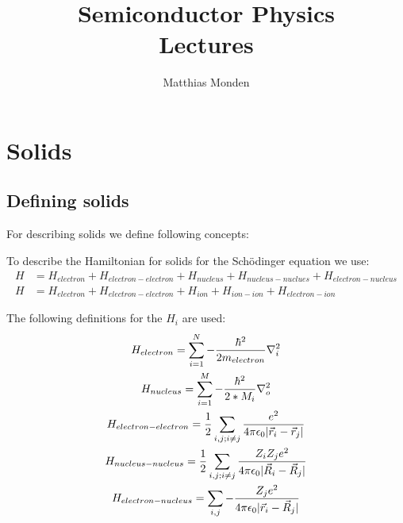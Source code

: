 \documentclass{report}
\title{\Huge{Semiconductor Physics}\\Lectures}
\author{\huge{Matthias Monden}}
\date{}
\begin{document}
\maketitle
\newpage%
\tableofcontents
\pagebreak

\chapter{Solids}
\section{Defining solids}
For describing solids we define following concepts:

To describe the Hamiltonian for solids for the Schödinger equation we use:
\begin{align}
	H &= H_{electron} + H_{electron - electron} + H_{nucleus} + H_{nucleus - nuclues} + H_{electron - nucleus} \\
	H &= H_{electron} + H_{electron - electron} + H_{ion} + H_{ion - ion} + H_{electron - ion}
\end{align} \par
The following definitions for the $H_{i}$ are used:
\begin{gather}
	H_{electron} = \sum_{i = 1}^{N}{-\frac{\hbar^2}{2m_{electron}} \nabla_i^2}\\
	H_{nucleus} = \sum_{i = 1}^{M}{-\frac{\hbar^2}{2*M_i} \nabla_o^2}\\
	H_{electron - electron} = \frac{1}{2} \sum_{i, j; i \neq j}^{}{\frac{e^2}{4 \pi \epsilon_0 \lvert\vec{r}_i - \vec{r}_j\rvert}}\\
	H_{nucleus - nucleus} = \frac{1}{2} \sum_{i, j; i \neq j}^{}{\frac{Z_i Z_j e^2}{4 \pi \epsilon_0 \lvert\vec{R}_i - \vec{R}_j\rvert}}\\
	H_{electron - nucleus} = \sum_{i, j}^{}{-\frac{Z_j e^2}{4 \pi \epsilon_0 \lvert\vec{r}_i - \vec{R}_j\rvert}}
\end{gather}
\end{document}
